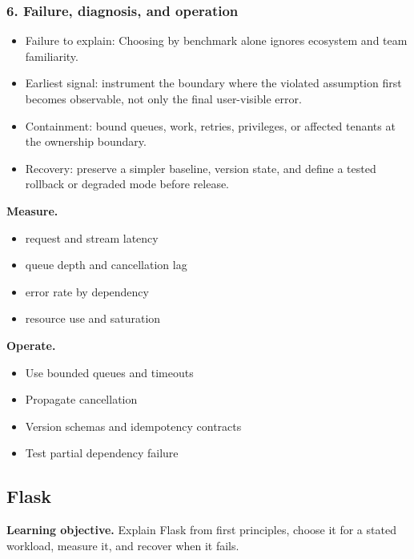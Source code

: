 \subsubsection*{6. Failure, diagnosis, and operation}
\begin{itemize}
\item Failure to explain: Choosing by benchmark alone ignores ecosystem and team familiarity.
\item Earliest signal: instrument the boundary where the violated assumption first becomes observable, not only the final user-visible error.
\item Containment: bound queues, work, retries, privileges, or affected tenants at the ownership boundary.
\item Recovery: preserve a simpler baseline, version state, and define a tested rollback or degraded mode before release.
\end{itemize}
\textbf{Measure.}\begin{itemize}
\item request and stream latency
\item queue depth and cancellation lag
\item error rate by dependency
\item resource use and saturation
\end{itemize}
\textbf{Operate.}\begin{itemize}
\item Use bounded queues and timeouts
\item Propagate cancellation
\item Version schemas and idempotency contracts
\item Test partial dependency failure
\end{itemize}
\subsection{Flask}
\textbf{Learning objective.} Explain Flask from first principles, choose it for a stated workload, measure it, and recover when it fails.

